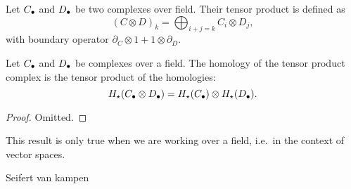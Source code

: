 
\begin{definition}
    Let $C_\bullet$ and  $D_\bullet$ be two complexes over field. Their tensor product is defined as
     \[
         (C \otimes D)_k = \bigoplus_{i+j = k} C_i \otimes D_j
    ,\] 
    with boundary operator $\partial_C \otimes 1 + 1 \otimes\partial_D$.
\end{definition}
\begin{prop}
    Let $C_\bullet$ and  $D_\bullet$ be complexes over a field.
    The homology of the tensor product complex is the tensor product of the homologies:
    \[
        H_\star(C_\bullet \otimes D_\bullet) = H_\star(C_\bullet) \otimes H_\star(D_\bullet)
    .\] 
    \label{prop:hom-tensor-is-tensor-hom}
\end{prop}
\begin{proof}
    Omitted.
\end{proof}
\begin{remark}
    This result is only true when we are working over a field, i.e.\ in the context of vector spaces.
\end{remark}


\begin{definition}

\end{definition}
\begin{definition}
    Seifert van kampen
\end{definition}
